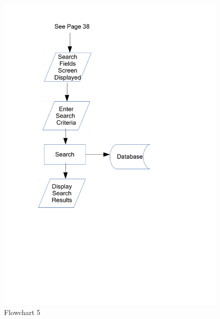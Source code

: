 \begin{figure}[H]
    \caption{Flowchart 5} \label{Flowchart_5.pdf}
    \includegraphics[width=\textwidth]{./Design/Flowcharts/Flowchart_5.pdf}
\end{figure}

